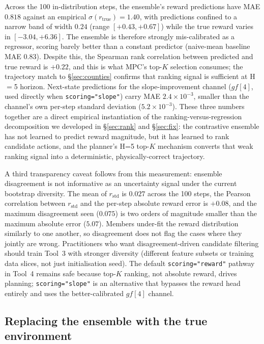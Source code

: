 \documentclass[11pt]{article}
\begin{document}
Across the 100 in-distribution steps, the ensemble's reward predictions have MAE $0.818$ against an empirical $\sigma(r_{\text{true}})=1.40$, with predictions confined to a narrow band of width $0.24$ (range $[+0.43, +0.67]$) while the true reward varies in $[-3.04, +6.36]$. The ensemble is therefore strongly mis-calibrated as a regressor, scoring barely better than a constant predictor (naive-mean baseline MAE $0.83$). Despite this, the Spearman rank correlation between predicted and true reward is $+0.22$, and this is what MPC's top-$K$ selection consumes; the trajectory match to \S\ref{sec:counties} confirms that ranking signal is sufficient at H$=$5 horizon. Next-state predictions for the slope-improvement channel ($gf[4]$, used directly when \texttt{scoring="slope"}) carry MAE $2.4\times 10^{-3}$, smaller than the channel's own per-step standard deviation ($5.2\times 10^{-3}$). These three numbers together are a direct empirical instantiation of the ranking-versus-regression decomposition we developed in \S\ref{sec:rank} and \S\ref{sec:fix}: the contrastive ensemble has not learned to predict reward magnitude, but it has learned to rank candidate actions, and the planner's H=5 top-$K$ mechanism converts that weak ranking signal into a deterministic, physically-correct trajectory.

A third transparency caveat follows from this measurement: ensemble disagreement is not informative as an uncertainty signal under the current bootstrap diversity. The mean of $r_{\text{std}}$ is $0.027$ across the 100 steps, the Pearson correlation between $r_{\text{std}}$ and the per-step absolute reward error is $+0.08$, and the maximum disagreement seen ($0.075$) is two orders of magnitude smaller than the maximum absolute error ($5.07$). Members under-fit the reward distribution similarly to one another, so disagreement does not flag the cases where they jointly are wrong. Practitioners who want disagreement-driven candidate filtering should train Tool~3 with stronger diversity (different feature subsets or training data slices, not just initialisation seed). The default \texttt{scoring="reward"} pathway in Tool~4 remains safe because top-$K$ ranking, not absolute reward, drives planning; \texttt{scoring="slope"} is an alternative that bypasses the reward head entirely and uses the better-calibrated $gf[4]$ channel.

\subsection*{Replacing the ensemble with the true environment}\label{sec:methods-trueenv}
\end{document}
